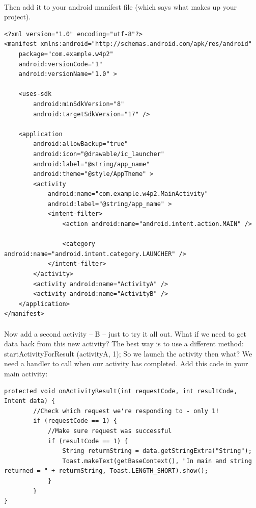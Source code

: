 \documentclass[12pt, a4paper, twoside]{book}
\begin{document}
\paragraph{} Then add it to your android manifest file (which says what makes up your project).

\begin{lstlisting}
<?xml version="1.0" encoding="utf-8"?>
<manifest xmlns:android="http://schemas.android.com/apk/res/android"
    package="com.example.w4p2"
    android:versionCode="1"
    android:versionName="1.0" >

    <uses-sdk
        android:minSdkVersion="8"
        android:targetSdkVersion="17" />

    <application
        android:allowBackup="true"
        android:icon="@drawable/ic_launcher"
        android:label="@string/app_name"
        android:theme="@style/AppTheme" >
        <activity
            android:name="com.example.w4p2.MainActivity"
            android:label="@string/app_name" >
            <intent-filter>
                <action android:name="android.intent.action.MAIN" />

                <category android:name="android.intent.category.LAUNCHER" />
            </intent-filter>
        </activity>
        <activity android:name="ActivityA" />
        <activity android:name="ActivityB" />
    </application>
</manifest>
\end{lstlisting}

\paragraph{} Now add a second activity – B – just to try it all out. What if we need to get data back from this new activity? The best way is to use a different method: startActivityForResult (activityA, 1);
So we launch the activity then what? We need a handler to call when our activity has completed. Add this code in your main activity:

\begin{lstlisting}
protected void onActivityResult(int requestCode, int resultCode, Intent data) {
    	//Check which request we're responding to - only 1!
    	if (requestCode == 1) {
    		//Make sure request was successful
    		if (resultCode == 1) {
    			String returnString = data.getStringExtra("String");
    			Toast.makeText(getBaseContext(), "In main and string returned = " + returnString, Toast.LENGTH_SHORT).show();
    		}
    	}
}
\end{lstlisting}
\end{document}
